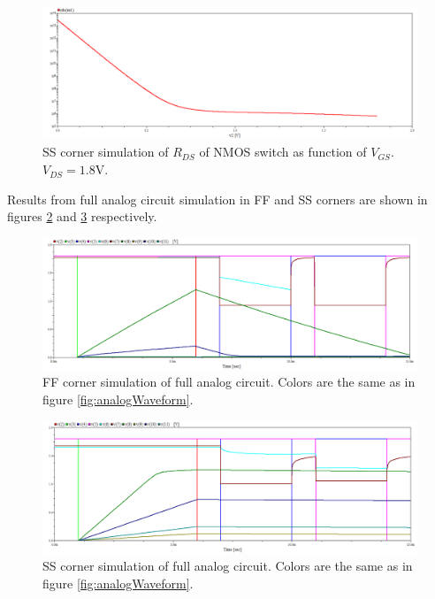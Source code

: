 \begin{figure}
    \centering
    \includegraphics[width=\textwidth]{graphs/corner_ss_simulation.png}
    \caption{SS corner simulation of $R_{DS}$ of NMOS switch as function of $V_{GS}$. $V_{DS} = 1.8\mathrm{V}$.}
    \label{fig:ss}
\end{figure}

Results from full analog circuit simulation in FF and SS corners are shown in figures \ref{fig:ffFull} and \ref{fig:ssFull} respectively.

\begin{figure}
    \centering
    \includegraphics[width=\textwidth]{graphs/analogWaveform_ff.png}
    \caption{FF corner simulation of full analog circuit. Colors are the same as in figure \ref{fig:analogWaveform}.}
    \label{fig:ffFull}
\end{figure}

\begin{figure}
    \centering
    \includegraphics[width=\textwidth]{graphs/analogWaveform_ss.png}
    \caption{SS corner simulation of full analog circuit. Colors are the same as in figure \ref{fig:analogWaveform}.}
    \label{fig:ssFull}
\end{figure}

